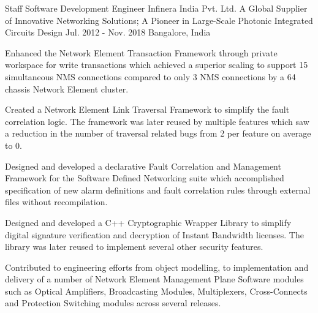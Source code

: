 \begin{cventries}
  \expentry
    {Staff Software Development Engineer} %
    {Infinera India Pvt. Ltd.} %
    {A Global Supplier of Innovative Networking Solutions; A Pioneer in Large-Scale Photonic Integrated Circuits Design} %
    {Jul. 2012 - Nov. 2018} %
    {Bangalore, India} %
    {
      \begin{cvitems} %
      \item {Enhanced the Network Element Transaction Framework through private workspace for write transactions which achieved a superior scaling to support 15 simultaneous NMS connections compared to only 3 NMS connections by a 64 chassis Network Element cluster.}
      \item {Created a Network Element Link Traversal Framework to simplify the fault correlation logic. The framework was later reused by multiple features which saw a reduction in the number of traversal related bugs from 2 per feature on average to 0.}
      \item {Designed and developed a declarative Fault Correlation and Management Framework for the Software Defined Networking suite which accomplished specification of new alarm definitions and fault correlation rules through external files without recompilation.}
      \item {Designed and developed a C++ Cryptographic Wrapper Library to simplify digital signature verification and decryption of Instant Bandwidth licenses. The library was later reused to implement several other security features.}
      \item {Contributed to engineering efforts from object modelling, to implementation and delivery of a number of Network Element Management Plane Software modules such as Optical Amplifiers, Broadcasting Modules, Multiplexers, Cross-Connects and Protection Switching modules across several releases.}
      \end{cvitems}
    }


\end{cventries}
